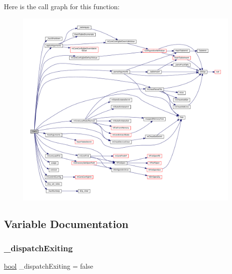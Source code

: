 Here is the call graph for this function\+:
\nopagebreak
\begin{figure}[H]
\begin{center}
\leavevmode
\includegraphics[width=350pt]{fuzz-main_8c_a3c04138a5bfe5d72780bb7e82a18e627_cgraph}
\end{center}
\end{figure}


\subsection{Variable Documentation}
\mbox{\label{fuzz-main_8c_a8525f6cde5f9256308f54df6d5b5ba37}} 
\subsubsection{\texorpdfstring{\+\_\+dispatch\+Exiting}{\_dispatchExiting}}
{\footnotesize\ttfamily \mbox{\hyperlink{libretro_8h_a4a26dcae73fb7e1528214a068aca317e}{bool}} \+\_\+dispatch\+Exiting = false\hspace{0.3cm}{\ttfamily [static]}}

